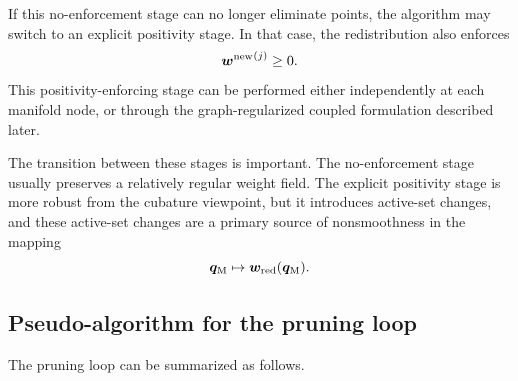 \documentclass[11pt,a4paper]{article}
\begin{document}
If this no-enforcement stage can no longer eliminate points, the algorithm may
switch to an explicit positivity stage. In that case, the redistribution also
enforces
\[
        {\bm w^{\mathrm{new}}}^{(j)}\geq 0.
\]
This positivity-enforcing stage can be performed either independently at each
manifold node, or through the graph-regularized coupled formulation described
later.

The transition between these stages is important. The no-enforcement stage
usually preserves a relatively regular weight field. The explicit positivity
stage is more robust from the cubature viewpoint, but it introduces active-set
changes, and these active-set changes are a primary source of nonsmoothness in
the mapping
\[
        \bm q_{\mathrm{M}}\mapsto\bm w_{\mathrm{red}}(\bm q_{\mathrm{M}}).
\]

\subsection{Pseudo-algorithm for the pruning loop}

The pruning loop can be summarized as follows.
\end{document}
